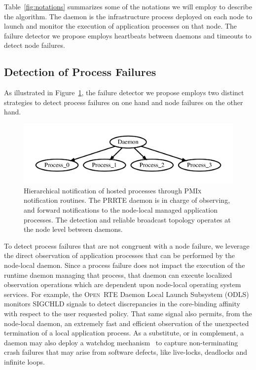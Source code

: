 \documentclass[sigconf]{acmart}
\newcommand{\prrte}[0]{\textsc{PRRTE}\xspace}
\newcommand{\pmix}[0]{\textsc{PMIx}\xspace}
\newcommand{\orte}[0]{\textsc{Open~RTE}\xspace}
\begin{document}
Table~\ref{fig:notations} summarizes some of the notations we will employ
to describe the algorithm. The daemon is the infrastructure
process deployed on each node to launch and monitor the execution of application
processes on that node. The failure detector we propose employs heartbeats
between daemons and timeouts to detect node failures.

\subsection{Detection of Process Failures}

As illustrated in Figure~\ref{fig:hosted}, the failure detector we propose
employs two distinct strategies to detect process failures on one hand
and node failures on the other hand.

\begin{figure}[h]
  \centering
  \includegraphics[width=\linewidth]{server_client.pdf}
  \caption{Hierarchical notification of hosted processes through \pmix notification routines. The \prrte daemon is in charge of observing, and forward notifications to the node-local managed application processes. The detection and reliable broadcast
  topology operates at the node level between daemons.}\label{fig:hosted}
\end{figure}

To detect process failures that are not congruent with a node failure, we
leverage the direct observation of application processes that can be
performed by the node-local daemon. Since a process failure does not
impact the execution of the runtime daemon managing that process, that
daemon can execute localized observation operations which are dependent
upon node-local operating system services. For example, the \orte Daemon
Local Launch Subsystem (ODLS) monitors SIGCHLD signals to detect discrepancies
in the core-binding affinity with respect to the user requested policy.
That same signal also permits, from the node-local daemon, an extremely fast and efficient observation
of the unexpected termination of a local application process. As a substitute,
or in complement, a daemon may also deploy a watchdog mechanism~\cite{CASTAIN18}
to capture non-terminating crash failures that may arise from software
defects, like live-locks, deadlocks and infinite loops.
\end{document}
